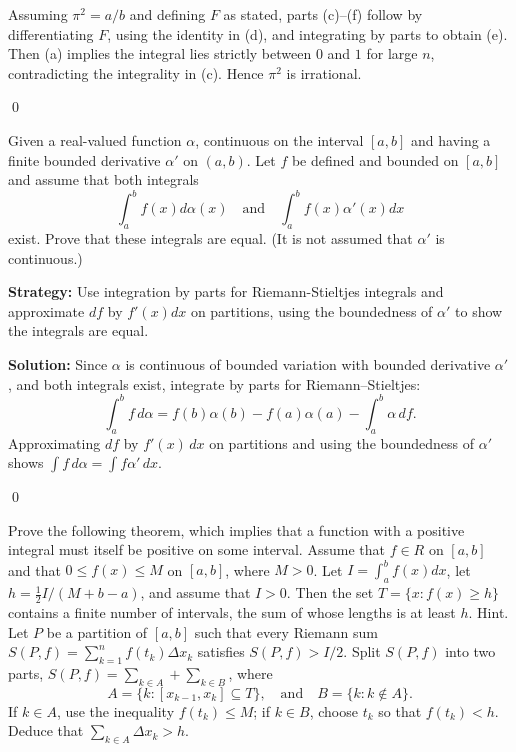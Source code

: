 Assuming $\pi^2=a/b$ and defining $F$ as stated, parts (c)–(f) follow by differentiating $F$, using the identity in (d), and integrating by parts to obtain (e). Then (a) implies the integral lies strictly between $0$ and $1$ for large $n$, contradicting the integrality in (c). Hence $\pi^2$ is irrational.




\qed
\begin{problembox}
\begin{problemstatement}
Given a real-valued function $\alpha$, continuous on the interval $[a, b]$ and having a finite bounded derivative $\alpha'$ on $(a, b)$. Let $f$ be defined and bounded on $[a, b]$ and assume that both integrals
\[\int_{a}^{b} f(x) d\alpha(x) \quad \text{and} \quad \int_{a}^{b} f(x) \alpha'(x) dx\]
exist. Prove that these integrals are equal. (It is not assumed that $\alpha'$ is continuous.)
\end{problemstatement}
\end{problembox}

\noindent\textbf{Strategy:} Use integration by parts for Riemann-Stieltjes integrals and approximate $df$ by $f'(x) dx$ on partitions, using the boundedness of $\alpha'$ to show the integrals are equal.

\bigskip\noindent\textbf{Solution:}
Since $\alpha$ is continuous of bounded variation with bounded derivative $\alpha'$, and both integrals exist, integrate by parts for Riemann–Stieltjes:
\[\int_a^b f\,d\alpha = f(b)\alpha(b)-f(a)\alpha(a)-\int_a^b \alpha\,df.
\]
Approximating $df$ by $f'(x)\,dx$ on partitions and using the boundedness of $\alpha'$ shows $\int f\,d\alpha=\int f\alpha'\,dx$.




\qed
\begin{problembox}
\begin{problemstatement}
Prove the following theorem, which implies that a function with a positive integral must itself be positive on some interval. Assume that $f \in R$ on $[a, b]$ and that $0 \leq f(x) \leq M$ on $[a, b]$, where $M > 0$. Let $I = \int_{a}^{b} f(x) dx$, let $h = \frac{1}{2} I/(M + b - a)$, and assume that $I > 0$. Then the set $T = \{ x : f(x) \geq h \}$ contains a finite number of intervals, the sum of whose lengths is at least $h$. Hint. Let $P$ be a partition of $[a, b]$ such that every Riemann sum $S(P, f) = \sum_{k=1}^{n} f(t_k) \Delta x_k$ satisfies $S(P, f) > I/2$. Split $S(P, f)$ into two parts, $S(P, f) = \sum_{k \in A} + \sum_{k \in B}$, where
\[A = \{ k : [x_{k-1}, x_k] \subseteq T \}, \quad \text{and} \quad B = \{ k : k \notin A \}.\]
If $k \in A$, use the inequality $f(t_k) \leq M$; if $k \in B$, choose $t_k$ so that $f(t_k) < h$. Deduce that $\sum_{k \in A} \Delta x_k > h$.
\end{problemstatement}
\end{problembox}

